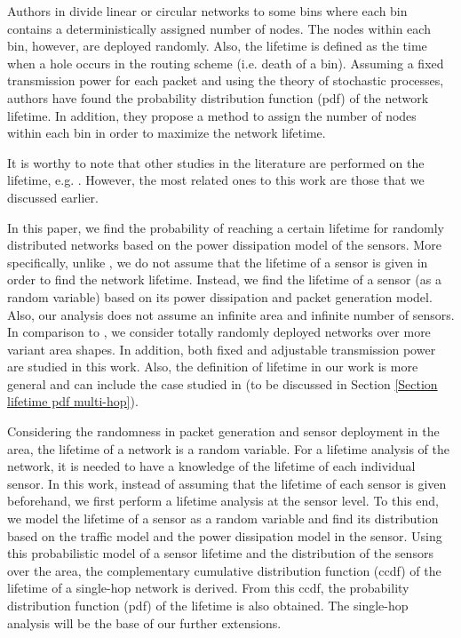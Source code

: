 \documentclass[conference]{IEEEtran}
\begin{document}
Authors in \cite{Rai_Lifetime_Modeling_DATE} divide linear or
circular networks to some bins where each bin contains a
deterministically assigned number of nodes. The nodes within each
bin, however, are deployed randomly. Also, the lifetime is defined
as the time when a hole occurs in the routing scheme (i.e. death of
a bin). Assuming a fixed transmission power for each packet and
using the theory of stochastic processes, authors have found the
probability distribution function (pdf) of the network lifetime. In
addition, they propose a method to assign the number of nodes within
each bin in order to maximize the network lifetime.



It is worthy to note that other studies in the literature are
performed on the lifetime, e.g.
\cite{DuarteMelo_Hetereogen_Globecom,Ganz_Lifetime_LargNet_Elsevier,Bydere_reliable_IEICE,
Chen_Lifetime_Commletter,Coleri_Automata_WSNA}. However, the most
related ones to this work are those that we discussed earlier.

In this paper, we find the probability of reaching a certain
lifetime for randomly distributed networks based on the power
dissipation model of the sensors. More specifically, unlike
\cite{Santi_Lifetime_cellbased, Hou_Alpha_lifetime}, we do not
assume that the lifetime of a sensor is given in order to find the
network lifetime. Instead, we find the lifetime of a sensor (as a
random variable) based on its power dissipation and packet
generation model. Also, our analysis does not assume an infinite
area and infinite number of sensors. In comparison to
\cite{Rai_Lifetime_Modeling_DATE}, we consider totally randomly
deployed networks over more variant area shapes. In addition, both
fixed and adjustable transmission power are studied in this work.
Also, the definition of lifetime in our work is more general and can
include the case studied in \cite{Rai_Lifetime_Modeling_DATE} (to be
discussed in Section \ref{Section lifetime pdf multi-hop}).

Considering the randomness in packet generation and sensor
deployment in the area, the lifetime of a network is a random
variable. For a lifetime analysis of the network, it is needed to
have a knowledge of the lifetime of each individual sensor. In this
work, instead of assuming that the lifetime of each sensor is given
beforehand, we first perform a lifetime analysis at the sensor
level. To this end, we model the lifetime of a sensor as a random
variable and find its distribution based on the traffic model and
the power dissipation model in the sensor. Using this probabilistic
model of a sensor lifetime and the distribution of the sensors over
the area, the complementary cumulative distribution function (ccdf)
of the lifetime of a single-hop network is derived. From this ccdf,
the probability distribution function (pdf) of the lifetime is also
obtained. The single-hop analysis will be the base of our further
extensions.
\end{document}
